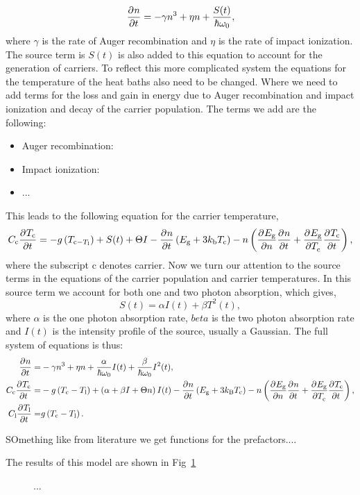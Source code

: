 \begin{equation}
  \pdv[]{n}{t}=-\gamma n^3 + \eta n + \frac{S(t)}{\hbar\omega_0},
\end{equation}
where $\gamma$ is the rate of Auger recombination and $\eta$ is the rate of impact ionization. The source term is $S(t)$ is also added to this equation to account for the generation of carriers. To reflect this more complicated system the equations for the temperature of the heat baths also need to be changed. Where we need to add terms for the loss and gain in energy due to Auger recombination and impact ionization and decay of the carrier population. The terms we add are the following:
\begin{itemize}
  \item Auger recombination:
  \item Impact ionization:
  \item ...
\end{itemize}
This leads to the following equation for the carrier temperature,
\begin{equation}
  C_{\text{c}}\pdv[]{T_{\text{c}}}{t}=-g\left(T_{\text{c}-T_{\text{l}}}\right)+S(t)+\Theta I - \pdv[]{n}{t}\left(E_{\text{g}}+3k_{\text{b}}T_{\text{c}}\right)-n\left(\pdv[]{E_{\text{g}}}{n}\pdv[]{n}{t}+\pdv[]{E_{\text{g}}}{T_{\text{c}}}\pdv[]{T_{\text{c}}}{t}\right),
\end{equation}
where the subscript $\text{c}$ denotes carrier. Now we turn our attention to the source terms in the equations of the carrier population and carrier temperatures. In this source term we account for both one and two photon absorption, which gives,
\begin{equation}
  S(t)= \alpha I(t) + \beta T^2(t),
\end{equation}
where $\alpha$ is the one photon absorption rate, $beta$ is the two photon absorption rate and $I(t)$ is the intensity profile of the source, usually a Gaussian. The full system of equations is thus:
\begin{align}
  \pdv[]{n}{t}=&-\gamma n^3+\eta n + \frac{\alpha}{\hbar\omega_0}I(t)+\frac{\beta}{\hbar\omega_0}I^2(t),\\
  C_{\text{c}}\pdv[]{T_{\text{c}}}{t}=&-g\left(T_{\text{c}}-T_{\text{l}}\right)+\left(\alpha+\beta I+\Theta n\right)I(t)-\pdv[]{n}{t}\left(E_{\text{g}}+3k_{\text{B}}T_{\text{c}}\right)-n\left(\pdv[]{E_{\text{g}}}{n}\pdv[]{n}{t}+\pdv[]{E_{\text{g}}}{T_{\text{c}}}\pdv[]{T_{\text{c}}}{t}\right),\\
  C_{\text{l}}\pdv[]{T_{\text{l}}}{t}=&g\left(T_{\text{c}}-T_{\text{l}}\right).
\end{align}

{\color{red} SOmething like from literature we get functions for the prefactors....}

The results of this model are shown in Fig~\ref{fig:CarrierTwoTemperatureModel}
\begin{figure}[!h]
  \centering
  \resizebox{0.8\textwidth}{!}{}
  \caption{...}
  \label{fig:CarrierTwoTemperatureModel}
\end{figure}
